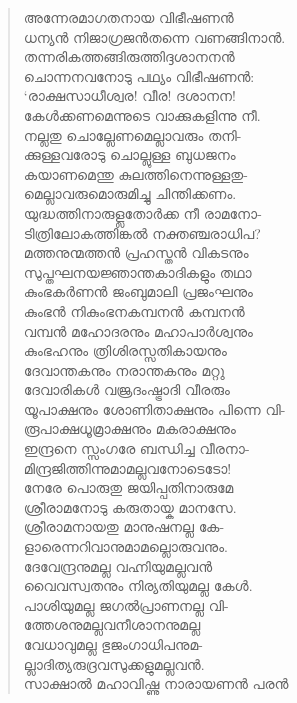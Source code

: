 \begin{verse}
അന്നേരമാഗതനായ വിഭീഷണന്‍\\
ധന്യന്‍ നിജാഗ്രജന്‍തന്നെ വണങ്ങിനാന്‍.\\
തന്നരികത്തങ്ങിരുത്തിദ്ദശാനനന്‍\\
ചൊന്നനവനോടു പഥ്യം വിഭീഷണന്‍:\\
‘രാക്ഷസാധീശ്വര! വീര! ദശാനന!\\
കേള്‍ക്കണമെന്നുടെ വാക്കുകളിന്നു നീ.\\
നല്ലതു ചൊല്ലേണമെല്ലാവരും തനി-\\
ക്കുള്ളവരോടു ചൊല്ലുള്ള ബുധജനം\\
കയാണമെന്തു കുലത്തിനെന്നുള്ളതു-\\
മെല്ലാവരുമൊരുമിച്ചു ചിന്തിക്കണം.\\
യുദ്ധത്തിനാരുള്ലതോര്‍ക്ക നീ രാമനോ-\\
ടിത്രിലോകത്തിങ്കല്‍ നക്തഞ്ചരാധിപ?\\
മത്തനുന്മത്തന്‍ പ്രഹസ്തന്‍ വികടനും\\
സുപ്തഘനയജ്ഞാന്തകാദികളും തഥാ\\
കുംഭകര്‍ണന്‍ ജംബുമാലി പ്രജംഘനും\\
കുംഭന്‍ നികുംഭനകമ്പനന്‍ കമ്പനന്‍\\
വമ്പന്‍ മഹോദരനും മഹാപാര്‍ശ്വനും\\
കുംഭഹനും ത്രിശിരസ്സതികായനും\\
ദേവാന്തകനും നരാന്തകനും മറ്റു\\
ദേവാരികള്‍ വജ്രദംഷ്ട്രാദി വീരരും\\
യൂപാക്ഷനും ശോണിതാക്ഷനും പിന്നെ വി-\\
രൂപാക്ഷധൂമ്രാക്ഷനും മകരാക്ഷനും\\
ഇന്ദ്രനെ സ്സംഗരേ ബന്ധിച്ച വീരനാ-\\
മിന്ദ്രജിത്തിന്നുമാമല്ലവനോടെടോ!\\
നേരേ പൊരുതു ജയിപ്പതിനാരുമേ\\
ശ്രീരാമനോടു കരുതായ്ക മാനസേ.\\
ശ്രീരാമനായതു മാനുഷനല്ല കേ-\\
ളാരെന്നറിവാനുമാമല്ലൊരുവനും.\\
ദേവേന്ദ്രനുമല്ല വഹ്നിയുമല്ലവന്‍\\
വൈവസ്വതനും നിര്യതിയുമല്ല കേള്‍.\\
പാശിയുമല്ല ജഗല്‍പ്രാണനല്ല വി-\\
ത്തേശനുമല്ലവനീശാനനുമല്ല\\
വേധാവുമല്ല ഭുജംഗാധിപനുമ-\\
ല്ലാദിത്യരുദ്രവസുക്കളുമല്ലവന്‍.\\
സാക്ഷാല്‍ മഹാവിഷ്ണു നാരായണന്‍ പരന്‍\\

\end{verse}
